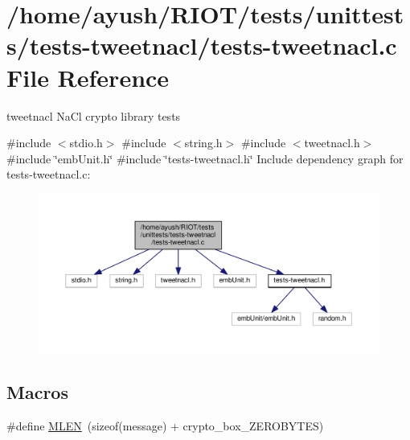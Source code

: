 \hypertarget{tests-tweetnacl_8c}{}\section{/home/ayush/\+R\+I\+O\+T/tests/unittests/tests-\/tweetnacl/tests-\/tweetnacl.c File Reference}
\label{tests-tweetnacl_8c}


tweetnacl Na\+Cl crypto library tests  


{\ttfamily \#include $<$stdio.\+h$>$}\newline
{\ttfamily \#include $<$string.\+h$>$}\newline
{\ttfamily \#include $<$tweetnacl.\+h$>$}\newline
{\ttfamily \#include \char`\"{}emb\+Unit.\+h\char`\"{}}\newline
{\ttfamily \#include \char`\"{}tests-\/tweetnacl.\+h\char`\"{}}\newline
Include dependency graph for tests-\/tweetnacl.c\+:
\nopagebreak
\begin{figure}[H]
\begin{center}
\leavevmode
\includegraphics[width=350pt]{tests-tweetnacl_8c__incl}
\end{center}
\end{figure}
\subsection*{Macros}
\begin{DoxyCompactItemize}
\item 
\#define \hyperlink{tests-tweetnacl_8c_ac3eedd936f5521b2f59607a6a21e6064}{M\+L\+EN}~(sizeof(message) + crypto\+\_\+box\+\_\+\+Z\+E\+R\+O\+B\+Y\+T\+ES)
\end{DoxyCompactItemize}
